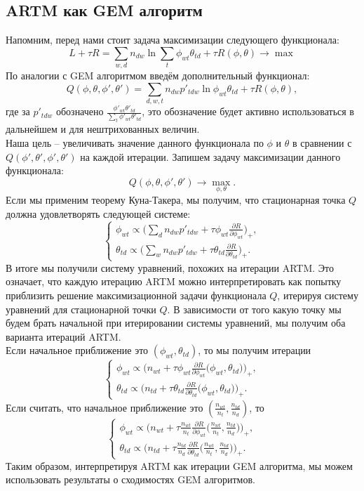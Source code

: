 \documentclass[12pt]{article}
\begin{document}
	\subsection{ARTM как GEM алгоритм}
	Напомним,  перед нами стоит задача максимизации следующего функционала:
\[
L + \tau R = \sum_{w,d} n_{dw} \ln\sum_t \phi_{wt} \theta_{td} + \tau R(\phi, \theta) \to \max
\]
По аналогии с GEM алгоритмом введём дополнительный функционал:
\[
	Q(\phi, \theta, \phi', \theta') = \sum\limits_{d, w, t} n_{dw} p'_{tdw} \ln{\phi_{wt}\theta_{td}} + \tau R(\phi, \theta),
\]
где за $p'_{tdw}$ обозначено $\frac{\phi'_{wt} \theta'_{td}}{\sum\limits_t \phi'_{wt} \theta'_{td}}$, это обозначение будет активно использоваться в дальнейшем и для нештрихованных величин. \\
Наша цель -- увеличивать значение данного функционала по $\phi$ и $\theta$ в сравнении с $Q(\phi', \theta', \phi', \theta')$ на каждой итерации. Запишем задачу максимизации данного функционала:
\[
Q(\phi, \theta, \phi', \theta') \to \max_{\phi, \theta}.
\]
Если мы применим теорему Куна-Такера, мы получим, что стационарная точка $Q$ должна удовлетворять следующей системе:
\[
\left\{
	\begin{aligned}
		\phi_{wt} \propto \bigg( \sum\limits_d n_{dw} p'_{tdw} + \tau\phi_{wt} \frac{\partial{R}}{\partial{\phi_{wt}}} \bigg)_{+},\\
		\theta_{td} \propto \bigg( \sum\limits_w n_{dw} p'_{tdw} + \tau\theta_{td} \frac{\partial{R}}{\partial{\theta_{td}}} \bigg)_{+}.
	\end{aligned}
\right.
\]
В итоге мы получили систему уравнений, похожих на итерации ARTM. Это означает, что каждую итерацию ARTM можно интерпретировать как попытку приблизить решение максимизационной задачи функционала $Q$, итерируя систему уравнений для стационарной точки $Q$. В зависимости от того какую точку мы будем брать начальной при итерировании системы уравнений, мы получим оба варианта итераций ARTM.\\
Если начальное приближение это $(\phi_{wt}, \theta_{td})$, то мы получим итерации
\[
\left\{
	\begin{aligned}
		\phi_{wt} \propto \bigg( n_{wt} + \tau\phi_{wt} \frac{\partial{R}}{\partial{\phi_{wt}}} \big( \phi_{wt}, \theta_{td}\big) \bigg)_{+},\\
		\theta_{td} \propto \bigg( n_{td} + \tau\theta_{td} \frac{\partial{R}}{\partial{\theta_{td}}} \big( \phi_{wt}, \theta_{td}\big) \bigg)_{+}.
	\end{aligned}
\right.
\]
Если считать, что начальное приближение это $(\frac{n_{wt}}{n_t}, \frac{n_{td}}{n_d})$, то
\[
\left\{
	\begin{aligned}
		\phi_{wt} \propto \bigg( n_{wt} + \tau \frac{n_{wt}}{n_t} \frac{\partial{R}}{\partial{\phi_{wt}}} \big(\frac{n_{wt}}{n_t}, \frac{n_{td}}{n_d}\big) \bigg)_{+},\\
		\theta_{td} \propto \bigg(n_{td} + \tau \frac{n_{td}}{n_d} \frac{\partial{R}}{\partial{\theta_{td}}} \big(\frac{n_{wt}}{n_t}, \frac{n_{td}}{n_d}\big) \bigg)_{+}.
	\end{aligned}
\right.
\]
Таким образом, интерпретируя ARTM как итерации GEM алгоритма, мы можем использовать результаты о сходимостях GEM алгоритмов.
\end{document}
